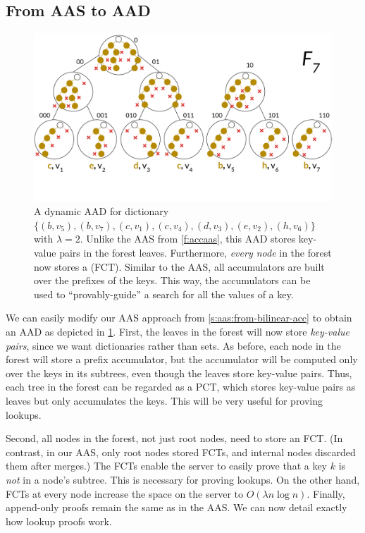 \subsection{From AAS to AAD}
\label{s:aad:from-acc:short}

\begin{figure}[t]
    \centering
    \includegraphics[width=.90\columnwidth]{figures-aad/accaad-short.pdf}
    \vspace{-1.7cm}
    \caption{
        A dynamic AAD for dictionary $\{(b,v_5),(b,v_7),(c,v_1),(c,v_4),(d,v_3),(e,v_2),(h,v_6)\}$ with $\lambda=2$.
        Unlike the AAS from \cref{f:accaas}, this AAD stores key-value pairs in the forest leaves.
        Furthermore, \textit{every node} in the forest now stores a \frontierCommunionTree (FCT).
        Similar to the AAS, all accumulators are built over the prefixes of the keys.
        This way, the accumulators can be used to ``provably-guide'' a search for all the values of a key.
    }
    \label{f:accaad-short}
\end{figure}

We can easily modify our AAS approach from \cref{s:aas:from-bilinear-acc} to obtain an AAD as depicted in \cref{f:accaad-short}.
First, the leaves in the forest will now store \textit{key-value pairs}, since we want dictionaries rather than sets.
As before, each node in the forest will store a prefix accumulator, but the accumulator will be computed only over the keys in its subtrees, even though the leaves store key-value pairs.
Thus, each tree in the forest can be regarded as a PCT, which stores key-value pairs as leaves but only accumulates the keys.
This will be very useful for proving lookups.

Second, all nodes in the forest, not just root nodes, need to store an FCT.
(In contrast, in our AAS, only root nodes stored FCTs, and internal nodes discarded them after merges.)
The FCTs enable the server to easily prove that a key $k$ is \textit{not} in a node's subtree.
This is necessary for proving lookups.
On the other hand, FCTs at every node increase the space on the server to $O(\lambda n \log{n})$.
Finally, append-only proofs remain the same as in the AAS.
We can now detail exactly how lookup proofs work.

